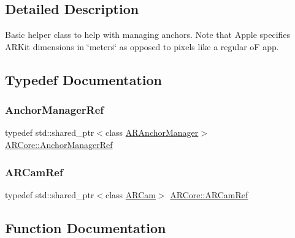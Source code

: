 \subsection{Detailed Description}
Basic helper class to help with managing anchors. Note that Apple specifies A\+R\+Kit dimensions in \char`\"{}meters\char`\"{} as opposed to pixels like a regular oF app. 

\subsection{Typedef Documentation}
\mbox{\label{namespace_a_r_core_a3f2b9ba00b51ce19c1010f554a66a512}} 
\subsubsection{\texorpdfstring{Anchor\+Manager\+Ref}{AnchorManagerRef}}
{\footnotesize\ttfamily typedef std\+::shared\+\_\+ptr$<$class \hyperlink{class_a_r_core_1_1_a_r_anchor_manager}{A\+R\+Anchor\+Manager}$>$ \hyperlink{namespace_a_r_core_a3f2b9ba00b51ce19c1010f554a66a512}{A\+R\+Core\+::\+Anchor\+Manager\+Ref}}

\mbox{\label{namespace_a_r_core_a4ebe9e23907235fcf76bf65440fde0e0}} 
\subsubsection{\texorpdfstring{A\+R\+Cam\+Ref}{ARCamRef}}
{\footnotesize\ttfamily typedef std\+::shared\+\_\+ptr$<$class \hyperlink{class_a_r_core_1_1_a_r_cam}{A\+R\+Cam}$>$ \hyperlink{namespace_a_r_core_a4ebe9e23907235fcf76bf65440fde0e0}{A\+R\+Core\+::\+A\+R\+Cam\+Ref}}



\subsection{Function Documentation}
\mbox{\label{namespace_a_r_core_a66ae704f1eff4b085765cc73635db8eb}} 
